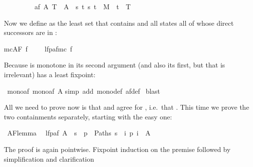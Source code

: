 \begin{isabellebody}
\ \ \ \ \ \ \ \ \ {\isachardoublequote}af\ A\ T\ {\isasymequiv}\ A\ {\isasymunion}\ {\isacharbraceleft}s{\isachardot}\ {\isasymforall}t{\isachardot}\ {\isacharparenleft}s{\isacharcomma}\ t{\isacharparenright}\ {\isasymin}\ M\ {\isasymlongrightarrow}\ t\ {\isasymin}\ T{\isacharbraceright}{\isachardoublequote}%
\begin{isamarkuptext}%
\noindent
Now we define  as the least set  that contains
 and all states all of whose direct successors are in :%
\end{isamarkuptext}%
{\isachardoublequote}mc{\isacharparenleft}AF\ f{\isacharparenright}\ \ \ \ {\isacharequal}\ lfp{\isacharparenleft}af{\isacharparenleft}mc\ f{\isacharparenright}{\isacharparenright}{\isachardoublequote}%
\begin{isamarkuptext}%
\noindent
Because  is monotone in its second argument (and also its first, but
that is irrelevant)  has a least fixpoint:%
\end{isamarkuptext}%
\ mono{\isacharunderscore}af{\isacharcolon}\ {\isachardoublequote}mono{\isacharparenleft}af\ A{\isacharparenright}{\isachardoublequote}\isanewline
{}simp\ add{\isacharcolon}\ mono{\isacharunderscore}def\ af{\isacharunderscore}def{\isacharparenright}\isanewline
{}\ blast\isanewline
{}%
\begin{isamarkuptext}%
All we need to prove now is that  and \isa{{\isasymTurnstile}}
agree for , i.e.\ that . This time we prove the two containments separately, starting
with the easy one:%
\end{isamarkuptext}%
\ AF{\isacharunderscore}lemma\isanewline
\ \ {\isachardoublequote}lfp{\isacharparenleft}af\ A{\isacharparenright}\ {\isasymsubseteq}\ {\isacharbraceleft}s{\isachardot}\ {\isasymforall}\ p\ {\isasymin}\ Paths\ s{\isachardot}\ {\isasymexists}\ i{\isachardot}\ p\ i\ {\isasymin}\ A{\isacharbraceright}{\isachardoublequote}%
\begin{isamarkuptxt}%
\noindent
The proof is again pointwise. Fixpoint induction on the premise  followed
by simplification and clarification%
\end{isamarkuptxt}%

\end{isabellebody}
